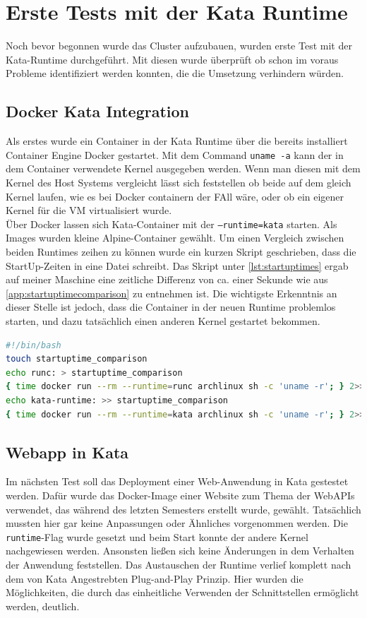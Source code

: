 \section{Erste Tests mit der Kata Runtime}
\label{ref:lokale_kata_tests}
Noch bevor begonnen wurde das Cluster aufzubauen, wurden erste Test mit der Kata-Runtime durchgeführt. 
Mit diesen wurde überprüft ob schon im voraus Probleme identifiziert werden konnten, die die Umsetzung verhindern würden. 

\subsection{Docker Kata Integration}
Als erstes wurde ein Container in der Kata Runtime über die bereits installiert Container Engine Docker gestartet.
Mit dem Command \texttt{uname -a} kann der in dem Container verwendete Kernel ausgegeben werden. 
Wenn man diesen mit dem Kernel des Host Systems vergleicht lässt sich feststellen ob beide auf dem gleich Kernel laufen, wie es bei Docker containern der FAll wäre, oder ob ein eigener Kernel für die VM virtualisiert wurde.
\\
Über Docker lassen sich Kata-Container mit der \texttt{--runtime=kata} starten.
Als Images wurden kleine Alpine-Container gewählt.
Um einen Vergleich zwischen beiden Runtimes zeihen zu können wurde ein kurzen Skript geschrieben, dass die StartUp-Zeiten in eine Datei schreibt.
Das Skript unter \ref{lst:startuptimes} ergab auf meiner Maschine eine zeitliche Differenz von ca. einer Sekunde wie aus \ref{app:startuptimecomparison} zu entnehmen ist. 
Die wichtigste Erkenntnis an dieser Stelle ist jedoch, dass die Container in der neuen Runtime problemlos starten, und dazu tatsächlich einen anderen Kernel gestartet bekommen.

\begin{lstlisting}[language=bash, caption={compare\_startup\_times.sh}, label=lst:startuptimes]
#!/bin/bash
touch startuptime_comparison
echo runc: > startuptime_comparison
{ time docker run --rm --runtime=runc archlinux sh -c 'uname -r'; } 2>> startuptime_comparison
echo kata-runtime: >> startuptime_comparison
{ time docker run --rm --runtime=kata archlinux sh -c 'uname -r'; } 2>> startuptime_comparison
\end{lstlisting}

\subsection{Webapp in Kata}
\label{ref:kata_plug_and_play}
Im nächsten Test soll das Deployment einer Web-Anwendung in Kata gestestet werden. 
Dafür wurde das Docker-Image einer Website zum Thema der Web\ac{API}s verwendet, das während des letzten Semesters erstellt wurde, gewählt. 
Tatsächlich mussten hier gar keine Anpassungen oder Ähnliches vorgenommen werden. 
Die \texttt{runtime}-Flag wurde gesetzt und beim Start konnte der andere Kernel nachgewiesen werden.
Ansonsten ließen sich keine Änderungen in dem Verhalten der Anwendung feststellen. 
Das Austauschen der Runtime verlief komplett nach dem von Kata Angestrebten Plug-and-Play Prinzip.
Hier wurden die Möglichkeiten, die durch das einheitliche Verwenden der Schnittstellen ermöglicht werden, deutlich. 

